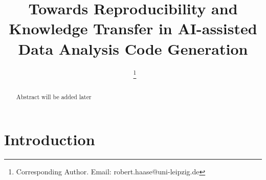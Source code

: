 \documentclass{ecai}
\begin{document}

\begin{frontmatter}




\title{Towards Reproducibility and Knowledge Transfer in AI-assisted Data Analysis Code Generation}


\author[A,B]{~\thanks{Corresponding Author. Email: robert.haase@uni-leipzig.de}}

\address[A]{Data Science Center, Leipzig University, Humboldtstra{\ss}e 25, 04105 Leipzig, Germany}
\address[B]{Center for Scalable Data Analytics and Artificial Intelligence (ScaDS.AI) Dresden / Leipzig}


\begin{abstract}

Abstract will be added later

\end{abstract}

\end{frontmatter}


\section{Introduction}
\end{document}
